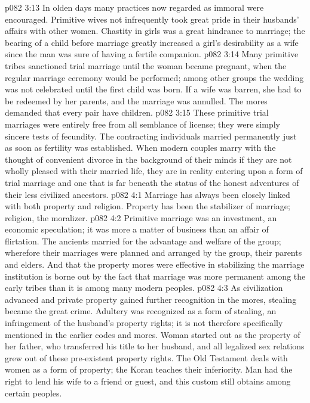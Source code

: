 \vs p082 3:13 In olden days many practices now regarded as immoral were encouraged. Primitive wives not infrequently took great pride in their husbands’ affairs with other women. Chastity in girls was a great hindrance to marriage; the bearing of a child before marriage greatly increased a girl’s desirability as a wife since the man was sure of having a fertile companion.
\vs p082 3:14 Many primitive tribes sanctioned trial marriage until the woman became pregnant, when the regular marriage ceremony would be performed; among other groups the wedding was not celebrated until the first child was born. If a wife was barren, she had to be redeemed by her parents, and the marriage was annulled. The mores demanded that every pair have children.
\vs p082 3:15 These primitive trial marriages were entirely free from all semblance of license; they were simply sincere tests of fecundity. The contracting individuals married permanently just as soon as fertility was established. When modern couples marry with the thought of convenient divorce in the background of their minds if they are not wholly pleased with their married life, they are in reality entering upon a form of trial marriage and one that is far beneath the status of the honest adventures of their less civilized ancestors.
\vs p082 4:1 Marriage has always been closely linked with both property and religion. Property has been the stabilizer of marriage; religion, the moralizer.
\vs p082 4:2 Primitive marriage was an investment, an economic speculation; it was more a matter of business than an affair of flirtation. The ancients married for the advantage and welfare of the group; wherefore their marriages were planned and arranged by the group, their parents and elders. And that the property mores were effective in stabilizing the marriage institution is borne out by the fact that marriage was more permanent among the early tribes than it is among many modern peoples.
\vs p082 4:3 As civilization advanced and private property gained further recognition in the mores, stealing became the great crime. Adultery was recognized as a form of stealing, an infringement of the husband’s property rights; it is not therefore specifically mentioned in the earlier codes and mores. Woman started out as the property of her father, who transferred his title to her husband, and all legalized sex relations grew out of these pre\hyp{}existent property rights. The Old Testament deals with women as a form of property; the Koran teaches their inferiority. Man had the right to lend his wife to a friend or guest, and this custom still obtains among certain peoples.
